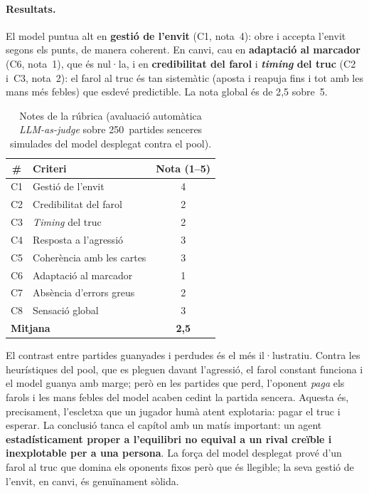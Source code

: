 \paragraph{Resultats.} El
model puntua alt en \textbf{gestió de l'envit} (C1, nota~4): obre i accepta l'envit segons
els punts, de manera coherent. En canvi, cau en \textbf{adaptació al marcador} (C6, nota~1),
que és nul·la, i en \textbf{credibilitat del farol} i \textbf{\emph{timing} del truc}
(C2 i~C3, nota~2): el farol al truc és tan sistemàtic (aposta i reapuja fins i tot amb les
mans més febles) que esdevé predictible. La nota global és de 2{,}5 sobre~5.

\begin{table}[H]
  \centering
  \begin{tabular}{clc}
    \toprule
    \# & Criteri & Nota (1--5) \\
    \midrule
    C1 & Gestió de l'envit        & 4 \\
    C2 & Credibilitat del farol   & 2 \\
    C3 & \emph{Timing} del truc   & 2 \\
    C4 & Resposta a l'agressió    & 3 \\
    C5 & Coherència amb les cartes& 3 \\
    C6 & Adaptació al marcador    & 1 \\
    C7 & Absència d'errors greus  & 2 \\
    C8 & Sensació global          & 3 \\
    \midrule
    \multicolumn{2}{l}{\textbf{Mitjana}} & \textbf{2{,}5} \\
    \bottomrule
  \end{tabular}
  \caption{Notes de la rúbrica (avaluació automàtica \emph{LLM-as-judge} sobre 250~partides
           senceres simulades del model desplegat contra el pool).}%
  \label{tab:res-notes}
\end{table}

El contrast entre partides guanyades i perdudes és el més il·lustratiu. Contra les
heurístiques del pool, que es pleguen davant l'agressió, el farol constant funciona i el
model guanya amb marge; però en les partides que perd, l'oponent \emph{paga} els farols i les
mans febles del model acaben cedint la partida sencera. Aquesta és, precisament, l'escletxa
que un jugador humà atent explotaria: pagar el truc i esperar. La conclusió tanca el capítol
amb un matís important: un agent \textbf{estadísticament proper a l'equilibri no equival a un
rival creïble i inexplotable per a una persona}. La força del model desplegat prové d'un
farol al truc que domina els oponents fixos però que és llegible; la seva gestió de l'envit,
en canvi, és genuïnament sòlida.
